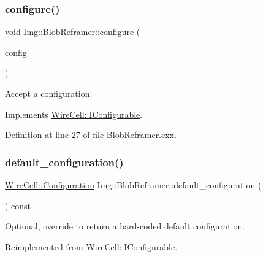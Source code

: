 \subsubsection{\texorpdfstring{configure()}{configure()}}
{\footnotesize\ttfamily void Img\+::\+Blob\+Reframer\+::configure (\begin{DoxyParamCaption}\item[{const \hyperlink{namespace_wire_cell_a9f705541fc1d46c608b3d32c182333ee}{Wire\+Cell\+::\+Configuration} \&}]{config }\end{DoxyParamCaption})\hspace{0.3cm}{\ttfamily [virtual]}}



Accept a configuration. 



Implements \hyperlink{class_wire_cell_1_1_i_configurable_a57ff687923a724093df3de59c6ff237d}{Wire\+Cell\+::\+I\+Configurable}.



Definition at line 27 of file Blob\+Reframer.\+cxx.

\mbox{\label{class_wire_cell_1_1_img_1_1_blob_reframer_ab01110630ea376303b88a39d03cc66ee}} 
\subsubsection{\texorpdfstring{default\+\_\+configuration()}{default\_configuration()}}
{\footnotesize\ttfamily \hyperlink{namespace_wire_cell_a9f705541fc1d46c608b3d32c182333ee}{Wire\+Cell\+::\+Configuration} Img\+::\+Blob\+Reframer\+::default\+\_\+configuration (\begin{DoxyParamCaption}{ }\end{DoxyParamCaption}) const\hspace{0.3cm}{\ttfamily [virtual]}}



Optional, override to return a hard-\/coded default configuration. 



Reimplemented from \hyperlink{class_wire_cell_1_1_i_configurable_a54841b2da3d1ea02189478bff96f7998}{Wire\+Cell\+::\+I\+Configurable}.



